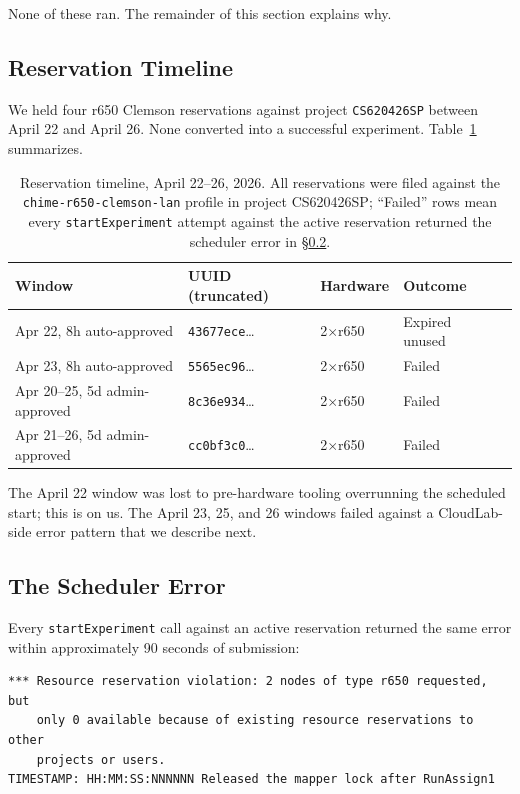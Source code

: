 \documentclass[11pt,a4paper]{article}
\begin{document}
None of these ran. The remainder of this section explains why.

\subsection{Reservation Timeline}

We held four r650 Clemson reservations against project \texttt{CS620426SP} between April 22 and April 26. None converted into a successful experiment. Table~\ref{tab:reservation-timeline} summarizes.

\begin{table}[H]
\centering
\small
\caption{Reservation timeline, April 22--26, 2026. All reservations were filed against the \texttt{chime-r650-clemson-lan} profile in project CS620426SP; ``Failed'' rows mean every \texttt{startExperiment} attempt against the active reservation returned the scheduler error in \S\ref{sec:postmortem-error}.}
\label{tab:reservation-timeline}
\begin{tabular}{@{}lllll@{}}
\toprule
Window & UUID (truncated) & Hardware & Outcome \\
\midrule
Apr 22, 8h auto-approved          & \texttt{43677ece}\ldots & 2$\times$r650 & Expired unused \\
Apr 23, 8h auto-approved          & \texttt{5565ec96}\ldots & 2$\times$r650 & Failed \\
Apr 20--25, 5d admin-approved     & \texttt{8c36e934}\ldots & 2$\times$r650 & Failed \\
Apr 21--26, 5d admin-approved     & \texttt{cc0bf3c0}\ldots & 2$\times$r650 & Failed \\
\bottomrule
\end{tabular}
\end{table}

The April 22 window was lost to pre-hardware tooling overrunning the scheduled start; this is on us. The April 23, 25, and 26 windows failed against a CloudLab-side error pattern that we describe next.

\subsection{The Scheduler Error}
\label{sec:postmortem-error}

Every \texttt{startExperiment} call against an active reservation returned the same error within approximately 90 seconds of submission:

\begin{lstlisting}
*** Resource reservation violation: 2 nodes of type r650 requested, but
    only 0 available because of existing resource reservations to other
    projects or users.
TIMESTAMP: HH:MM:SS:NNNNNN Released the mapper lock after RunAssign1
\end{lstlisting}
\end{document}
